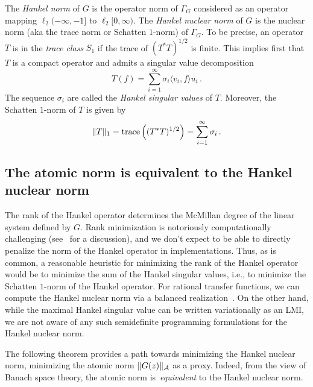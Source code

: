 The \emph{Hankel norm} of $G$ is the operator norm of $\Gamma_G$ considered as an operator mapping $\ell_2(-\infty,-1]$ to $\ell_2[0,\infty)$. The \emph{Hankel nuclear norm} of $G$ is the nuclear norm (aka the trace norm or Schatten $1$-norm) of $\Gamma_G$.  To be precise, an operator $T$ is in the \emph{trace class} $S_1$ if the trace of $(T^*T)^{1/2}$ is finite.  This implies first that $T$ is a compact operator and admits a singular value decomposition
\begin{equation*}
    T(f) = \sum_{i=1}^\infty \sigma_i \langle v_i, f \rangle u_i \,.
\end{equation*}
The sequence $\sigma_i$ are called the \emph{Hankel singular values} of $T$.  Moreover, the Schatten $1$-norm of $T$ is given by
\begin{equation*}
    \|T\|_1 = \operatorname{trace}\left((T^*T)^{1/2}\right) =
    \sum_{i=1}^\infty \sigma_i\,.
\end{equation*}

\subsection{The atomic norm is equivalent to the Hankel nuclear norm}
The rank of the Hankel operator determines the McMillan degree
of the linear system defined by $G$.  Rank minimization is notoriously computationally challenging (see~\cite{Recht10} for a discussion), and we don't expect to be able to directly penalize the norm of the Hankel operator in implementations.  Thus, as is common, a reasonable heuristic for minimizing the rank of the Hankel operator would be to minimize the sum of the Hankel singular values, i.e., to minimize the Schatten $1$-norm of the Hankel operator.  For rational transfer functions, we can compute the Hankel nuclear norm via a balanced realization~\cite{Zhou95}.  On the other hand, while the maximal Hankel singular value can be written variationally as an LMI, we are not aware of any such semidefinite programming formulations for the Hankel nuclear norm.  

The following theorem provides a path towards minimizing the Hankel nuclear norm, minimizing the atomic norm $\|G(z)\|_{\mathcal{A}}$ as a proxy.  Indeed, from the view of Banach space theory, the atomic norm is~\emph{equivalent} to the Hankel nuclear norm.

